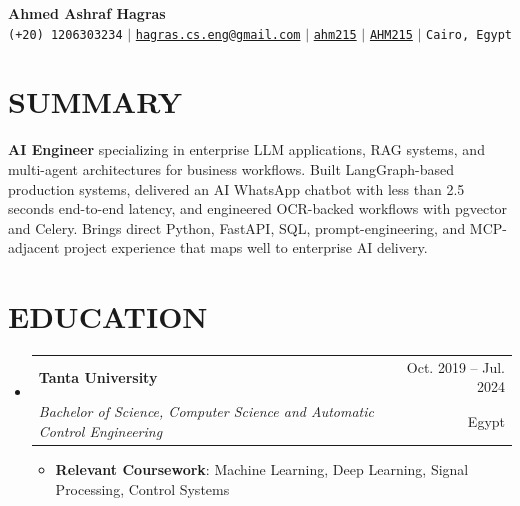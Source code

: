 \documentclass[letterpaper,11pt]{article}
\makeatletter
\newcommand{\resumeItem}[1]{
  \item\small{
    {#1 \vspace{-1pt}}
  }
}
\newcommand{\resumeSubheading}[4]{
  \vspace{-1pt}\item
    \begin{tabular*}{\textwidth}[t]{l@{\extracolsep{\fill}}r}
      \textbf{#1} & {\color{dark-grey}\small #2}\vspace{1pt}\\
      \textit{#3} & {\color{dark-grey} \small #4}\\
    \end{tabular*}\vspace{-4pt}
}
\newcommand{\resumeSubHeadingListStart}{\begin{itemize}[leftmargin=0in, label={}]}
\newcommand{\resumeSubHeadingListEnd}{\end{itemize}}
\newcommand{\resumeItemListStart}{\begin{itemize}}
\newcommand{\resumeItemListEnd}{\end{itemize}\vspace{0pt}}
\makeatother
\begin{document}
\begin{center}
    \textbf{\Huge Ahmed Ashraf Hagras} \\ \vspace{5pt}
    \small \faPhone* \texttt{(+20) 1206303234} \hspace{1pt} $|$
    \hspace{1pt} \faEnvelope \hspace{2pt} \href{mailto:hagras.cs.eng@gmail.com}{\texttt{hagras.cs.eng@gmail.com}} \hspace{1pt} $|$
    \hspace{1pt} \faLinkedin \hspace{2pt} \href{https://www.linkedin.com/in/ahm215}{\texttt{ahm215}} \hspace{1pt} $|$
    \hspace{1pt} \faGithub \hspace{2pt} \href{https://github.com/AHM215}{\texttt{AHM215}} \hspace{1pt} $|$
    \hspace{1pt} \faMapMarker* \hspace{2pt}\texttt{Cairo, Egypt}
    \\ \vspace{-3pt}
\end{center}

\section{SUMMARY}
\small{
\textbf{AI Engineer} specializing in enterprise LLM applications, RAG systems, and multi-agent architectures for business workflows. Built LangGraph-based production systems, delivered an AI WhatsApp chatbot with less than 2.5 seconds end-to-end latency, and engineered OCR-backed workflows with pgvector and Celery. Brings direct Python, FastAPI, SQL, prompt-engineering, and MCP-adjacent project experience that maps well to enterprise AI delivery.
}

\section{EDUCATION}
  \resumeSubHeadingListStart
    \resumeSubheading
      {Tanta University}{Oct. 2019 -- Jul. 2024}
      {Bachelor of Science, Computer Science and Automatic Control Engineering}{Egypt}
      \resumeItemListStart
        \resumeItem{\textbf{Relevant Coursework}: Machine Learning, Deep Learning, Signal Processing, Control Systems}
      \resumeItemListEnd
  \resumeSubHeadingListEnd
\end{document}

